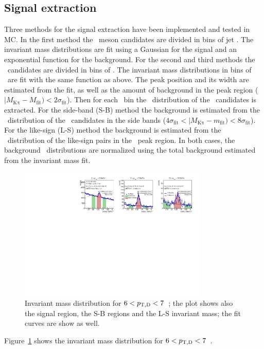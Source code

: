 \subsection{Signal extraction}
Three methods for the signal extraction have been implemented and tested in MC.
In the first method the \Dzero\ meson candidates are divided in bins of jet \pt. The invariant mass distributions
are fit using a Gaussian for the signal and an exponential function for the background.
For the second and third methods the \Dzero\ candidates are divided in bins of \ptd. 
The invariant mass distributions in bins of \ptd\ are fit with the same function as above. The
peak position and its width are estimated from the fit, as well as the amount of background in the peak region ($|M_{\mathrm{K\pi}}-M_{\mathrm{fit}}) < 2\sigma_{\mathrm{fit}}$).
Then for each \ptd\ bin the \ptchjet\ distribution of the \Dzero\ candidates is extracted.
For the side-band (S-B) method the background is estimated from the \ptchjet\ distribution of the \Dzero\ candidates in the side bands ($4\sigma_{\mathrm{fit}} < |M_{\mathrm{K\pi}}-m_{\mathrm{fit}}) < 8\sigma_{\mathrm{fit}}$).
For the like-sign (L-S) method the background is estimated from the \ptchjet\ distribution of the like-sign pairs in the \Dzero\ peak region.
In both cases, the background \ptchjet\ distributions are normalized using the total background estimated from the invariant mass fit.
\begin{figure}[tbh]
\begin{center}
\includegraphics[width=0.8\textwidth]{img/HQ16_Simulation_InvMassSB}
 \caption{Invariant mass distribution for $6 < p_{\mathrm{T,D}} < 7$~\GeVc; the plot shows also the signal region, the S-B regions and the L-S invariant mass; the fit curves are show as well.} 
 \label{fig:HQ16_Simulation_InvMassSB}
\end{center}
\end{figure}
Figure~\ref{fig:HQ16_Simulation_InvMassSB} shows the invariant mass distribution for $6 < p_{\mathrm{T,D}} < 7$~\GeVc. 


